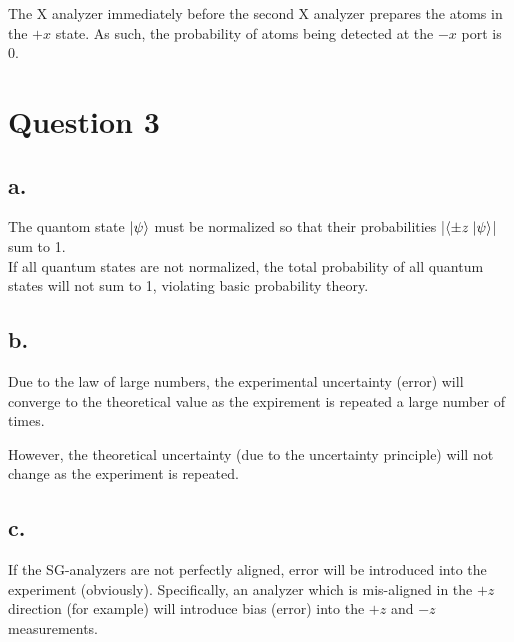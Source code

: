 \noindent
The X analyzer immediately before the second X analyzer prepares the atoms in the $+x$ state. As such,
the probability of atoms being detected at the $-x$ port is 0.

\section*{Question 3}

\subsection*{a.}

\noindent
The quantom state $\ket{\psi}$ must be normalized so that their probabilities |$\braket{\pm z \; | \psi}$|
sum to 1. \\

\noindent
If all quantum states are not normalized, the total probability of all quantum states will not sum to 1,
violating basic probability theory.

\subsection*{b.}

\noindent
Due to the law of large numbers, the experimental uncertainty (error) will converge to
the theoretical value as the expirement is repeated a large number of times.

\noindent
However, the theoretical uncertainty (due to the uncertainty principle) will
not change as the experiment is repeated.

\subsection*{c.}

\noindent
If the SG-analyzers are not perfectly aligned, error will be introduced into the experiment (obviously).
Specifically, an analyzer which is mis-aligned in the $+z$ direction (for example) will introduce
bias (error) into the $+z$ and $-z$ measurements.